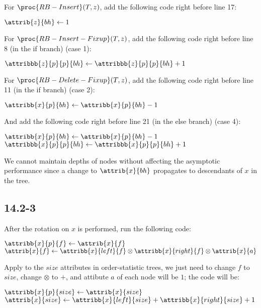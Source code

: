\noindent
For $\proc{RB-Insert}(T, z)$, 
add the following code right before line 17:

\begin{codebox}
    \zi $\attrib{z}{bh} \gets 1$
\end{codebox}

\noindent
For $\proc{RB-Insert-Fixup}(T, z)$, 
add the following code right before line 8 (in the if branch) (case 1):

\begin{codebox}
    \zi $\attribbb{z}{p}{p}{bh} \gets \attribbb{z}{p}{p}{bh} + 1$
\end{codebox}

\noindent
For $\proc{RB-Delete-Fixup}(T, z)$, 
add the following code right before line 11 (in the if branch) (case 2):

\begin{codebox}
    \zi $\attribb{x}{p}{bh} \gets \attribb{x}{p}{bh} - 1$
\end{codebox}

\noindent
And add the following code right before line 21 (in the else branch) (case 4):

\begin{codebox}
    \zi $\attribb{x}{p}{bh} \gets \attribb{x}{p}{bh} - 1$
    \zi $\attribbb{x}{p}{p}{bh} \gets \attribbb{x}{p}{p}{bh} + 1$
\end{codebox}

\noindent
We cannot maintain depths of nodes without affecting the asymptotic performance
since a change to $\attrib{x}{bh}$ propagates to descendants of $x$ in the tree.

\subsection*{14.2-3}

\noindent
After the rotation on $x$ is performed, run the following code:

\begin{codebox}
    \li $\attribb{x}{p}{f} \gets \attrib{x}{f}$
    \li $\attrib{x}{f} \gets \attribb{x}{left}{f} \otimes \attribb{x}{right}{f} \otimes \attrib{x}{a}$
\end{codebox}

\noindent
Apply to the $size$ attributes in order-statistic trees, 
we just need to change $f$ to $size$, change $\otimes$ to $+$, and attibute $a$ of each node will be $1$;
the code will be:

\begin{codebox}
    \li $\attribb{x}{p}{size} \gets \attrib{x}{size}$
    \li $\attrib{x}{size} \gets \attribb{x}{left}{size} + \attribb{x}{right}{size} + 1$
\end{codebox}

